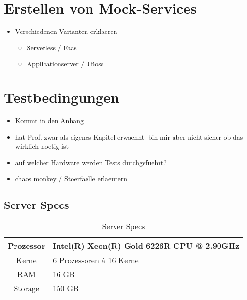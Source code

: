 \section{Erstellen von Mock-Services}
\begin{itemize}
  \item Verschiedenen Varianten erklaeren
	\begin{itemize}
	  \item Serverless / Faas
	  \item Applicationserver / JBoss
	\end{itemize}
\end{itemize}

\section{Testbedingungen}
\begin{itemize}
  \item Kommt in den Anhang
  \item hat Prof. zwar als eigenes Kapitel erwaehnt, bin mir aber nicht sicher ob das wirklich noetig ist
  \item auf welcher Hardware werden Tests durchgefuehrt?
  \item chaos monkey / Stoerfaelle erlaeutern
\end{itemize}


\subsection{Server Specs}

\begin{table}
  \centering
  \caption{Server Specs}
  \bigskip
  \begin{tabular}{ c l }
    \toprule
    Prozessor & Intel(R) Xeon(R) Gold 6226R CPU @ 2.90GHz \\
    \midrule
    Kerne & 6 Prozessoren á 16 Kerne \\
    \midrule
    RAM & 16 GB \\
    \midrule
    Storage & 150 GB \\
    \bottomrule
  \end{tabular}
\end{table}
